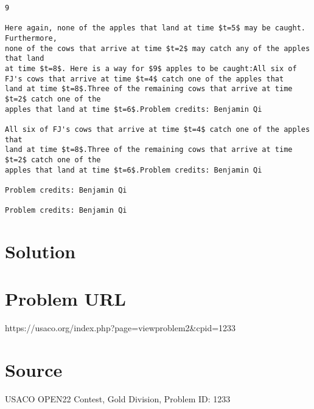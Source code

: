 \documentclass[12pt]{article}
\begin{document}
\begin{verbatim}
9

Here again, none of the apples that land at time $t=5$ may be caught. Furthermore,
none of the cows that arrive at time $t=2$ may catch any of the apples that land
at time $t=8$. Here is a way for $9$ apples to be caught:All six of FJ's cows that arrive at time $t=4$ catch one of the apples that
land at time $t=8$.Three of the remaining cows that arrive at time $t=2$ catch one of the
apples that land at time $t=6$.Problem credits: Benjamin Qi

All six of FJ's cows that arrive at time $t=4$ catch one of the apples that
land at time $t=8$.Three of the remaining cows that arrive at time $t=2$ catch one of the
apples that land at time $t=6$.Problem credits: Benjamin Qi

Problem credits: Benjamin Qi

Problem credits: Benjamin Qi
\end{verbatim}

\section*{Solution}


\section*{Problem URL}
https://usaco.org/index.php?page=viewproblem2&cpid=1233

\section*{Source}
USACO OPEN22 Contest, Gold Division, Problem ID: 1233
\end{document}
